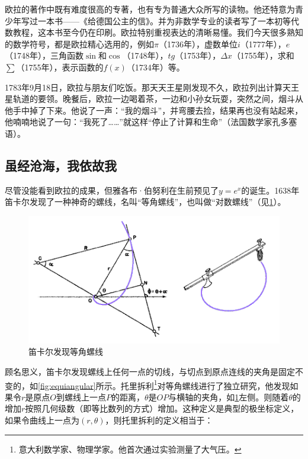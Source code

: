 \documentclass[b5paper]{ctexart}
\begin{document}
\begin{mdframed}
欧拉的著作中既有难度很高的专著，也有专为普通大众所写的读物。他还特意为青少年写过一本书——《给德国公主的信》。并为非数学专业的读者写了一本初等代数教程，这本书至今仍在印刷。欧拉特别重视表达的清晰易懂。我们今天很多熟知的数学符号，都是欧拉精心选用的，例如$\pi$（1736年），虚数单位$i$（1777年），$e$（1748年），三角函数$\sin$和$\cos$（1748年），$tg$（1753年），$\Delta x$（1755年），求和$\sum$（1755年），表示函数的$f(x)$（1734年）等\cite{HanXueTao2009}。

1783年9月18日，欧拉与朋友们吃饭。那天天王星刚发现不久，欧拉列出计算天王星轨道的要领。晚餐后，欧拉一边喝着茶，一边和小孙女玩耍，突然之间，烟斗从他手中掉了下来。他说了一声：“我的烟斗”，并弯腰去捡，结果再也没有站起来，他喃喃地说了一句：“我死了……”就这样“停止了计算和生命”（法国数学家孔多塞语）。
\end{mdframed}

\subsection{虽经沧海，我依故我}
尽管没能看到欧拉的成果，但雅各布·伯努利在生前预见了$y = e^x$的诞生。1638年笛卡尔发现了一种神奇的螺线，名叫“等角螺线”，也叫做“对数螺线”（见\cref{fig:decartes-equiangular-spiral}）。

\begin{figure}[htbp]
 \centering
 \includegraphics[scale=0.5]{img/descartesspiral}
 \caption{笛卡尔发现等角螺线}
 \label{fig:decartes-equiangular-spiral}
\end{figure}

顾名思义，笛卡尔发现螺线上任何一点的切线，与切点到原点连线的夹角是固定不变的，如\cref{fig:equiangular}所示\cite{Descartes-1638}。托里拆利\footnote{意大利数学家、物理学家。他首次通过实验测量了大气压。}对等角螺线进行了独立研究，他发现如果令$r$是原点$O$到螺线上一点$P$的距离，$\theta$是$OP$与横轴的夹角，如\cref{fig:decartes-equiangular-spiral}左侧。则随着$\theta$的增加$r$按照几何级数（即等比数列的方式）增加。这种定义是典型的极坐标定义，如果令曲线上一点为$(r, \theta)$，则托里拆利的定义相当于：
\end{document}
